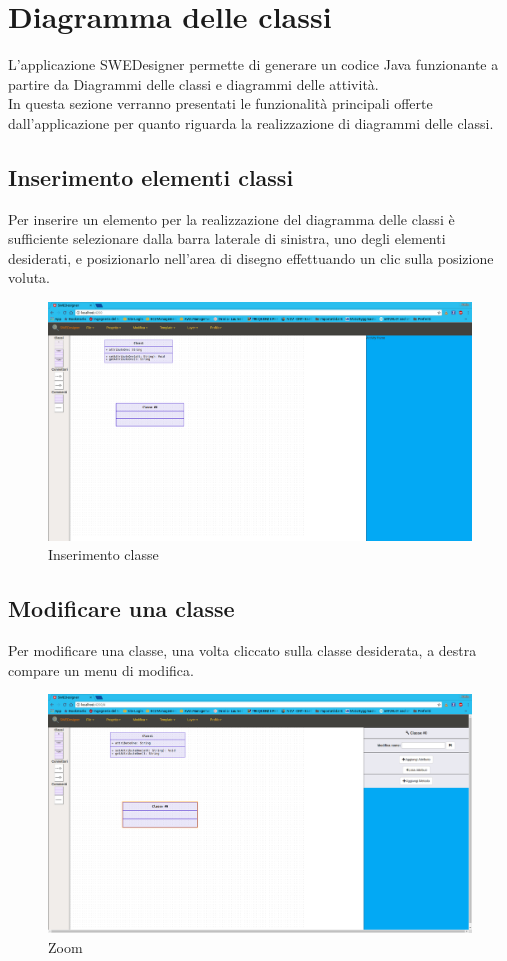 \section{Diagramma delle classi}
L'applicazione SWEDesigner permette di generare un codice Java funzionante a partire da Diagrammi delle classi e diagrammi delle attività.\\
In questa sezione verranno presentati le funzionalità principali offerte dall'applicazione per quanto riguarda la realizzazione di diagrammi delle classi.

\subsection{Inserimento elementi classi}
Per inserire un elemento per la realizzazione del diagramma delle classi è sufficiente selezionare dalla barra laterale di sinistra, uno degli elementi desiderati, e posizionarlo nell'area di disegno effettuando un clic sulla posizione voluta.
\begin{figure}[h!]
	\centering
		\includegraphics[scale=0.22]{res/img/insClasse.png}
	\caption{Inserimento classe}
\end{figure}
\newpage

\subsection{Modificare una classe}
Per modificare una classe, una volta cliccato sulla classe desiderata, a destra compare un menu di modifica.
\begin{figure}[h!]
	\centering
		\includegraphics[scale=0.22]{res/img/editClass.png}
	\caption{Zoom}
\end{figure}
\newpage

